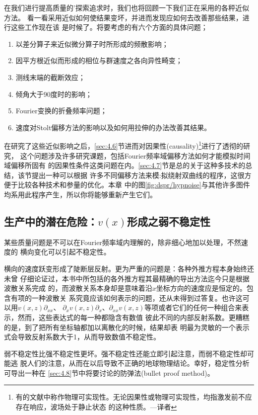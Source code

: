 在我们进行提高质量的'探索追求时，我们也将回顾一下我们正在采用的各秤近似方法。
看一看采用近似如何使结果变坏，并进而发现应如何去改善那些结果，进行这些工作现在该
是时候了。将要考虑的有六个方面的具体问题；
\begin{enumerate}
\item 
以差分算子来近似微分算子时所形成的频散影响；

\item 
因平方根近似而形成的相位与群速度之各向异性畸变；

\item
测线末端的截断效应；

\item
倾角大于$90$度时的影响；

\item
Fourier变换的折叠频率问题；

\item 
速度对Stolt偏移方法的影响以及如何用拉伸的办法改善其结果。

\end{enumerate}


在研究了这些近似影响之后，\ref{sec:4.6}节进而对因果性(causality)\footnote{
有的文献中称作物理可实现性。无论因果性或物理可实现性，均指激发前不应存在响应，波场处于静止状态
的这种性质。---译者
}进行了透彻的研究，
这个问题涉及许多研究课题，包括Fourier频率域偏移方法如何才能模拟时间域偏移所固有
的因果性条件这类问题在内。\ref{sec:4.7}节是总的关于这种多技术的总结，该节提出一种可以根据
许多不同偏移方法来模:拟绕射双曲线的程序，这很方便于比较各种技术和参量的优化。本章
中的图\ref{fig:dspr/hypnoise}与其他许多图件均系用此程序产生，所以你将能够重新产生它们。

\subsection{生产中的潜在危险：$v(x)$形成之弱不稳定性}
\label{sec:3.0.3}

某些质量问题是不可以在Fourier频率域内理解的，除非细心地加以处理，不然速度的
横向变化可以引起不稳定性。

横向的速度跃变形成了陡断层反射。更为严重的问题是：各种外推方程本身始终还未曾
仔细论证过，本书中所包括的各外推方程其最精确的导出方法迄今只是根据波散关系完成
的，而波散关系本身却是意味着沿$x$坐标方向的速度应是恒定的。包含有项的一种波散关
系究竟应该如何表示的问题，还从未得到过答复。也许这可以用$v(x,z)\partial_{xx}$、
$\partial_xv(x,z)\partial_x$、$\partial_{xx}v(x,z)$等项或者它们的任何一种组合来表示，然而，这些表达式的每一种都隐含有数值
彼此不同的内部反射系数。更糟糕的是，到了把所有坐标轴都加以离散化的时候，结果却表
明最为灵敏的一个表示式会导致反射系数大于1，从而导致数值不稳定性。

弱不稳定性比强不稳定性更坏。强不稳定性还能立即引起注意，而弱不稳定性却可能逃
脱人们的注意，从而在以后导致不正确的地球物理结论。幸好，稳定性分析可导出一种在
\ref{sec:4.8}节中将要讨论的防弹法(bullet proof method)。
